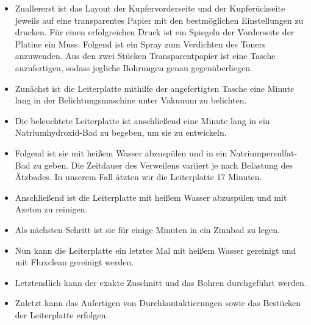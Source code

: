 \begin{itemize}
\item Zuallererst ist das Layout der Kupfervorderseite und der Kupferückseite jeweils auf eine transparentes Papier mit den bestmöglichen Einstellungen zu drucken.
Für einen erfolgreichen Druck ist ein Spiegeln der Vorderseite der Platine ein Muss.
Folgend ist ein Spray zum Verdichten des Toners anzuwenden.
Aus den zwei Stücken Transparentpapier ist eine Tasche anzufertigen, sodass jegliche Bohrungen genau gegenüberliegen. \\

\item Zunächst ist die Leiterplatte mithilfe der angefertigten Tasche eine Minute lang in der Belichtungsmaschine unter Vakuuum zu belichten. \\

\item Die beleuchtete Leiterplatte ist anschließend eine Minute lang in ein Natriumhydroxid-Bad zu begeben, um sie zu entwickeln. \\

\item Folgend ist sie mit heißem Wasser abzuspülen und in ein Natriumpersulfat-Bad zu geben.
Die Zeitdauer des Verweilens variiert je nach Belastung des Ätzbades.
In unserem Fall ätzten wir die Leiterplatte 17 Minuten. \\

\item Anschließend ist die Leiterplatte mit heißem Wasser abzuspülen und mit Azeton zu reinigen. \\

\item Als nächsten Schritt ist sie für einige Minuten in ein Zinnbad zu legen. \\

\item Nun kann die Leiterplatte ein letztes Mal mit heißem Wasser gereinigt und mit Fluxclean gereinigt werden.

\item Letztendlich kann der exakte Zuschnitt und das Bohren durchgeführt werden. \\

\item Zuletzt kann das Anfertigen von Durchkontaktierungen sowie das Bestücken der Leiterplatte erfolgen.
\end{itemize}


